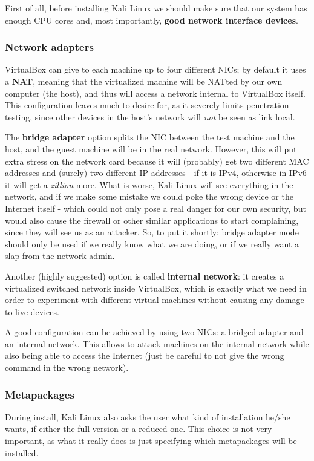 First of all, before installing Kali Linux we should make sure that our system has enough CPU cores and, most importantly, \textbf{good network interface devices}.


\subsubsection*{Network adapters}
VirtualBox can give to each machine up to four different NICs; by default it uses a \textbf{NAT}, meaning that the virtualized machine will be NATted by our own computer (the host), and thus will access a network internal to VirtualBox itself. This configuration leaves much to desire for, as it severely limits penetration testing, since other devices in the host’s network will \textit{not} be seen as link local.

The \textbf{bridge adapter} option splits the NIC between the test machine and the host, and the guest machine will be in the real network. However, this will put extra stress on the network card because it will (probably) get two different MAC addresses and (surely) two different IP addresses - if it is IPv4, otherwise in IPv6 it will get a \textit{zillion} more. What is worse, Kali Linux will see everything in the network, and if we make some mistake we could poke the wrong device or the Internet itself - which could not only pose a real danger for our own security, but would also cause the firewall or other similar applications to start complaining, since they will see us as an attacker. So, to put it shortly: bridge adapter mode should only be used if we really know what we are doing, or if we really want a slap from the network admin.
 
Another (highly suggested) option is called \textbf{internal network}: it creates a virtualized switched network inside VirtualBox, which is exactly what we need in order to experiment with different virtual machines without causing any damage to live devices.

A good configuration can be achieved by using two NICs: a bridged adapter and an internal network. This allows to attack machines on the internal network while also being able to access the Internet (just be careful to not give the wrong command in the wrong network).


\subsubsection*{Metapackages}
During install, Kali Linux also asks the user what kind of installation he/she wants, if either the full version or a reduced one. This choice is not very important, as what it really does is just specifying which metapackages will be installed.

